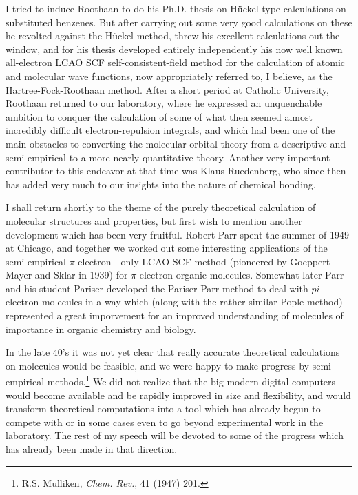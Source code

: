 \documentclass[11pt]{memoir}
\begin{document}
I tried to induce Roothaan to do his Ph.D. thesis on H\"{u}ckel-type calculations on substituted benzenes.  But after carrying out some very good calculations on these he revolted against the H\"{u}ckel method, threw his excellent calculations out the window, and for his thesis developed entirely independently his now well known all-electron LCAO SCF self-consistent-field method for the calculation of atomic and molecular wave functions, now appropriately referred to, I believe, as the Hartree-Fock-Roothaan method.  After a short period at Catholic University, Roothaan returned to our laboratory, where he expressed an unquenchable ambition to conquer the calculation of some of what then seemed almost incredibly difficult electron-repulsion integrals, and which had been one of the main obstacles to converting the molecular-orbital theory from a descriptive and semi-empirical to a more nearly quantitative theory.  Another very important contributor to this endeavor at that time was Klaus Ruedenberg, who since then has added very much to our insights into the nature of chemical bonding.

I shall return shortly to the theme of the purely theoretical calculation of molecular structures and properties, but first wish to mention another development which has been very fruitful.  Robert Parr spent the summer of 1949 at Chicago, and together we worked out some interesting applications of the semi-empirical $\pi$-electron - only LCAO SCF method (pioneered by Goeppert-Mayer and Sklar in 1939) for $\pi$-electron organic molecules.  Somewhat later Parr and his student Pariser developed the Pariser-Parr method to deal with $pi$-electron molecules in a way which (along with the rather similar Pople method) represented a great imporvement for an improved understanding of molecules of importance in organic chemistry and biology.

In the late 40's it was not yet clear that really accurate theoretical calculations on molecules would be feasible, and we were happy to make progress by semi-empirical methods.\footnote{R.S. Mulliken, \emph{Chem. Rev.}, 41 (1947) 201.}   We did not realize that the big modern digital computers would become available and be rapidly improved in size and flexibility, and would transform theoretical computations into a tool which has already begun to compete with or in some cases even to go beyond experimental work in the laboratory.  The rest of my speech will be devoted to some of the progress which has already been made in that direction.
\end{document}
